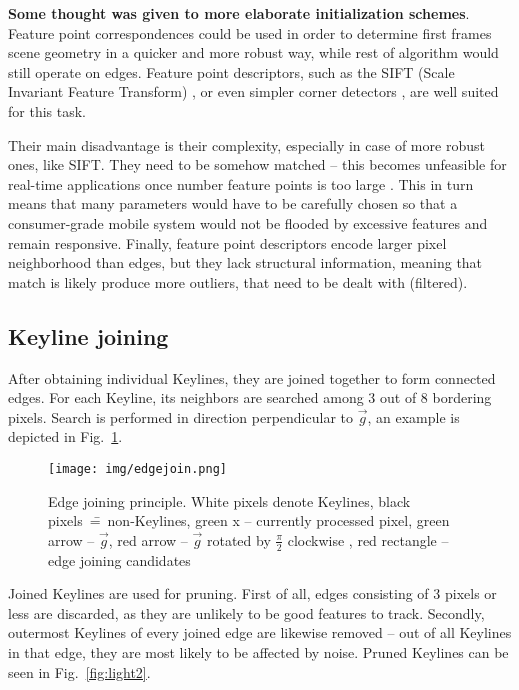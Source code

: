 \textbf{Some thought was given to more elaborate initialization schemes}. Feature point correspondences could be used in order to determine first frames scene geometry \cite{semi_dense} in a quicker and more robust way, while rest of algorithm would still operate on edges. Feature point descriptors, such as the SIFT (Scale Invariant Feature Transform) \cite{sift}, or even simpler corner detectors \cite{harris} \cite{shi1994good}, are well suited for this task.

Their main disadvantage is their complexity, especially in case of more robust ones, like SIFT. They need to be somehow matched -- this becomes unfeasible for real-time applications once number feature points is too large \cite{szczesny}. This in turn means that many parameters would have to be carefully chosen so that a consumer-grade mobile system would not be flooded by excessive features and remain responsive. Finally, feature point descriptors encode larger pixel neighborhood than edges, but they lack structural information, meaning that match is likely produce more outliers, that need to be dealt with (filtered).


\subsection{Keyline joining}

After obtaining individual Keylines, they are joined together to form connected edges.
For each Keyline, its neighbors are searched among 3 out of 8 bordering pixels. Search is performed in direction perpendicular to $\vec{g}$, an example is depicted in Fig.~\ref{fig:edgejoin}.

\begin{figure}[ht]
	\centering\texttt{[image: img/edgejoin.png]}
	\caption{ Edge joining principle. White pixels denote Keylines, black pixels~\==~non-Keylines, green x -- currently processed pixel, green arrow -- $\vec{g}$, red arrow -- $\vec{g}$ rotated by $\frac{\pi}{2}$ clockwise , red rectangle -- edge joining candidates }
	\label{fig:edgejoin}
\end{figure}


Joined Keylines are used for pruning. First of all, edges consisting of 3 pixels or less are discarded, as they are unlikely to be good features to track. Secondly, outermost Keylines of every joined edge are likewise removed -- out of all Keylines in that edge, they are most likely to be affected by noise. Pruned Keylines can be seen in Fig.~\ref{fig:light2}.


